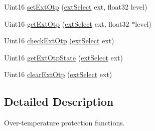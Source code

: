 \begin{DoxyCompactItemize}
\item 
Uint16 \hyperlink{a00034_a6790a4babfd805b692a2410d6920fc13}{set\-Ext\-Otp} (\hyperlink{a00027_a258413561252a6c94af200747272a9f3}{ext\-Select} ext, float32 level)
\item 
Uint16 \hyperlink{a00034_a3e177278b2eba8404cda5240902c9cf8}{get\-Ext\-Otp} (\hyperlink{a00027_a258413561252a6c94af200747272a9f3}{ext\-Select} ext, float32 $\ast$level)
\item 
Uint16 \hyperlink{a00034_a3bf6ccb465aa4c60464dece3f4bb2dcc}{check\-Ext\-Otp} (\hyperlink{a00027_a258413561252a6c94af200747272a9f3}{ext\-Select} ext)
\item 
Uint16 \hyperlink{a00034_a4b40fa3df1da35063225d79c83e85a0c}{get\-Ext\-Otp\-State} (\hyperlink{a00027_a258413561252a6c94af200747272a9f3}{ext\-Select} ext)
\item 
Uint16 \hyperlink{a00034_a6444030799cca288f6ac6925a6b4171a}{clear\-Ext\-Otp} (\hyperlink{a00027_a258413561252a6c94af200747272a9f3}{ext\-Select} ext)
\end{DoxyCompactItemize}


\subsection{Detailed Description}
Over-\/temperature protection functions. 

